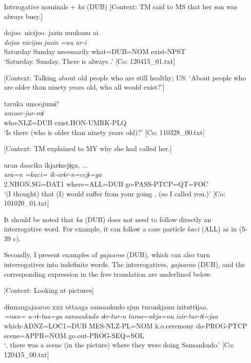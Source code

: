 \ea \label{ex:5:39}   Intrrogative nominals + \textit{ka} (DUB)
 \ea \label{ex:5:39a} [Context: TM said to MS that her son was always busy.]

\glll  {\textbar}dojoo{\textbar}.  {\textbar}nicijoo{\textbar}.  jazin  nuukanu  ai.\\
\textit{dojoo}  \textit{nicijoo}  \textit{jazin}  \textit{=nu}  \textit{ar-i}\\
Saturday  Sunday  necessarily  what=DUB=NOM  exist-NPST\\
\glt ‘Saturday. Sunday. There is always .’ [Co: 120415\_01.txt]

 \ex \label{ex:5:39b} [Context: Talking about old people who are still healthy; US: ‘About people who are older than ninety years old, who all would exist?’]

\glll  taruka  umoojumɨ?\\
\textit{}  \textit{umoor-jur-mɨ}\\
who-NLZ=DUB  exist.HON-UMRK-PLQ\\
\glt ‘Is there  (who is older than ninety years old)?’ [Co: 110328\_00.txt]

 \ex \label{ex:5:39c} [Context: TM explained to MY why she had called her.]

\glll  uran  daacika  ikjarɨncjɨga, ...\\
\textit{ura=n}  \textit{=kaci=}  \textit{ik-arɨr-n=ccjɨ=ga}\\
2.NHON.SG=DAT1  where=ALL=DUB  go-PASS-PTCP=QT=FOC\\
\glt ‘(I thought) that (I) would suffer from your going , (so I called you.)’ [Co: 101020\_01.txt]
\z
\z

It should be noted that \textit{ka} (DUB) does not need to follow directly an interrogative word. For example, it can follow a case particle \textit{kaci} (ALL) as in (5-39 c).

  Secondly, I present examples of \textit{gajaaroo} (DUB), which can also turn interrogatives into indefinite words. The interrogatives, \textit{gajaaroo} (DUB), and the corresponding expression in the free translation are underlined below.

\ea \label{ex:5:40}  \ea \label{ex:5:40a} [Context: Looking at pictures]

\glll  dɨnnangajaaroo  xxx  uttaaga  {\textbar}sansankudo{\textbar}   sjun  turonkjanu  izituttɨjaa.\footnotemark\\
\textit{=nan=}    \textit{u-rɨ-taa=ga}  \textit{sansankudo}   \textit{sɨr-tur-n}  \textit{turoo=nkja=nu}  \textit{izir-tur-tɨ=jaa}\\
which-ADNZ=LOC1=DUB    MES-NLZ-PL=NOM  k.o.ceremony   do-PROG-PTCP  scene=APPR=NOM  go.out-PROG-SEQ=SOL      \\
\glt ‘, there was a scene (in the picture) where they were doing Sansankudo.’ [Co: 120415\_00.txt]

